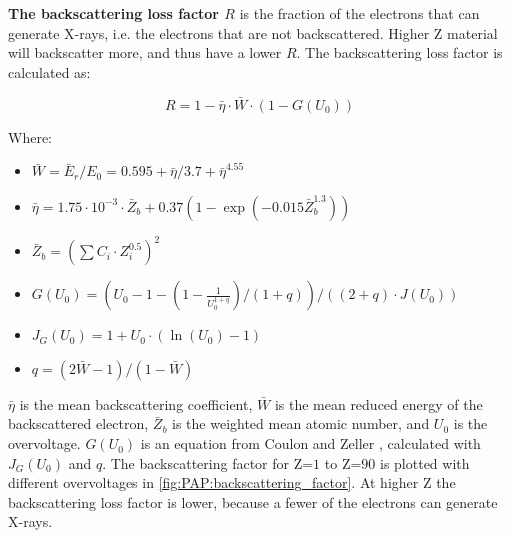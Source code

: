 
\textbf{The backscattering loss factor $R$} is the fraction of the electrons that can generate X-rays, i.e. the electrons that are not backscattered.
Higher Z material will backscatter more, and thus have a lower $R$.
The backscattering loss factor is calculated as:

\begin{equation}
    \label{eq:theory:quantitative:pap:calculation_of_F:R}
    R = 1 - \bar{\eta}  \cdot \bar{W} \cdot (1-G(U_0))
\end{equation}

Where:

\begin{itemize}
    \item  $\bar{W} = \bar{E}_r/E_0 = 0.595 + \bar{\eta}/3.7 + \bar{\eta}^{4.55} $
    \item  $\bar{\eta} = 1.75 \cdot 10^{-3} \cdot \bar{Z}_b + 0.37(1-\exp(-0.015\bar{Z}_b^{1.3})) $
    \item  $\bar{Z}_b = (\sum C_i \cdot Z_i^{0.5})^2$
    \item  $G(U_0) = (U_0 - 1 - (1- \frac{1}{U_0^{1+q}})/(1+q)) / ((2+q)\cdot J(U_0))$
    \item  $J_G(U_0) = 1 + U_0 \cdot (\ln(U_0)-1) $
    \item  $q = (2 \bar{W} - 1) / (1 - \bar{W}) $
\end{itemize}


$\bar{\eta}$ is the mean backscattering coefficient, $\bar{W}$ is the mean reduced energy of the backscattered electron, $\bar{Z}_b$ is the weighted mean atomic number, and $U_0$ is the overvoltage.
$G(U_0)$ is an equation from Coulon and Zeller \cite[Reference 28]{pap_1991}, calculated with $J_G(U_0)$ and $q$.
The backscattering factor for Z=$1$ to Z=$90$ is plotted with different overvoltages in \cref{fig:PAP:backscattering_factor}.
At higher Z the backscattering loss factor is lower, because a fewer of the electrons can generate X-rays.


